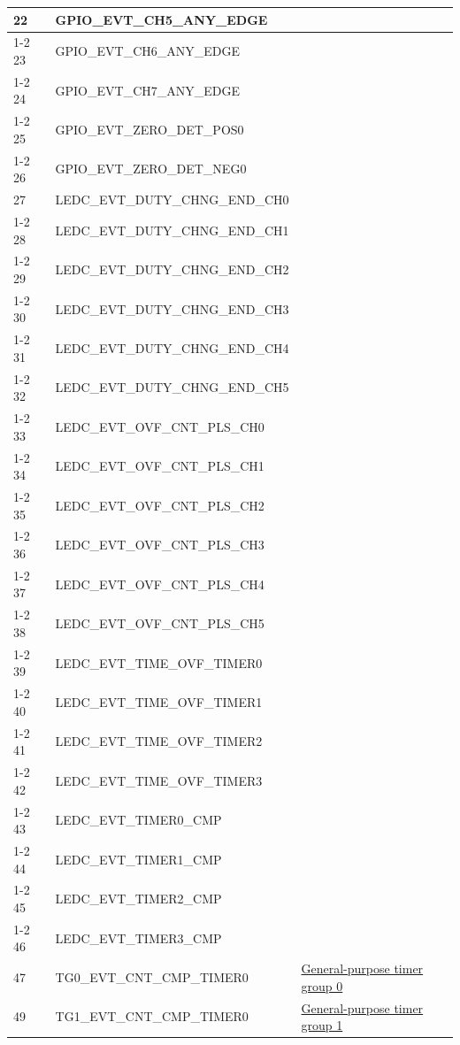 \documentclass[main\_\_EN.tex]{subfiles}
\begin{document}
\begin{longtable}{ | l | l | l | }
22  & GPIO\_EVT\_CH5\_ANY\_EDGE &  \\ \cline{1-2}
23  & GPIO\_EVT\_CH6\_ANY\_EDGE &  \\ \cline{1-2}
24  & GPIO\_EVT\_CH7\_ANY\_EDGE &  \\ \cline{1-2}
25  & GPIO\_EVT\_ZERO\_DET\_POS0 &  \\ \cline{1-2}
26  & GPIO\_EVT\_ZERO\_DET\_NEG0 &  \\ \hline
27  & LEDC\_EVT\_DUTY\_CHNG\_END\_CH0  & \nameref{mod:ledpwm}\\ \cline{1-2}
28  & LEDC\_EVT\_DUTY\_CHNG\_END\_CH1  & \\ \cline{1-2}
29  & LEDC\_EVT\_DUTY\_CHNG\_END\_CH2  & \\ \cline{1-2}
30  & LEDC\_EVT\_DUTY\_CHNG\_END\_CH3  & \\ \cline{1-2}
31  & LEDC\_EVT\_DUTY\_CHNG\_END\_CH4  & \\ \cline{1-2}
32  & LEDC\_EVT\_DUTY\_CHNG\_END\_CH5  & \\ \cline{1-2}
33  & LEDC\_EVT\_OVF\_CNT\_PLS\_CH0    & \\ \cline{1-2}
34  & LEDC\_EVT\_OVF\_CNT\_PLS\_CH1    & \\ \cline{1-2}
35  & LEDC\_EVT\_OVF\_CNT\_PLS\_CH2    & \\ \cline{1-2}
36  & LEDC\_EVT\_OVF\_CNT\_PLS\_CH3    & \\ \cline{1-2}
37  & LEDC\_EVT\_OVF\_CNT\_PLS\_CH4    & \\ \cline{1-2}
38  & LEDC\_EVT\_OVF\_CNT\_PLS\_CH5    & \\ \cline{1-2}
39  & LEDC\_EVT\_TIME\_OVF\_TIMER0     & \\ \cline{1-2}
40  & LEDC\_EVT\_TIME\_OVF\_TIMER1     & \\ \cline{1-2}
41  & LEDC\_EVT\_TIME\_OVF\_TIMER2     & \\ \cline{1-2}
42  & LEDC\_EVT\_TIME\_OVF\_TIMER3     & \\ \cline{1-2}
43  & LEDC\_EVT\_TIMER0\_CMP    & \\ \cline{1-2}
44  & LEDC\_EVT\_TIMER1\_CMP    & \\ \cline{1-2}
45  & LEDC\_EVT\_TIMER2\_CMP    & \\ \cline{1-2}
46  & LEDC\_EVT\_TIMER3\_CMP    & \\ \hline
47  & TG0\_EVT\_CNT\_CMP\_TIMER0    & \hyperref[mod:timg]{General-purpose timer group 0}   \\ \hline
49  & TG1\_EVT\_CNT\_CMP\_TIMER0    & \hyperref[mod:timg]{General-purpose timer group 1}   \\ \hline

\end{longtable}
\end{document}
